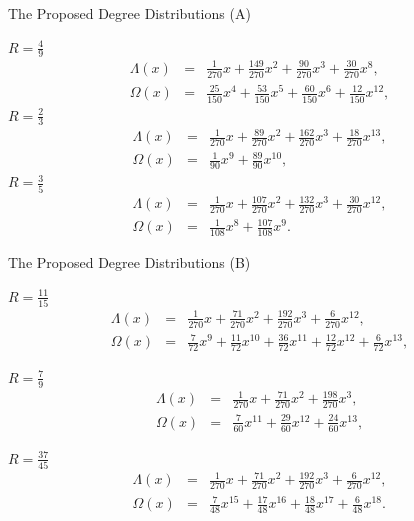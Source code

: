 \documentclass[11pt, aspectratio=169]{beamer}
\begin{document}
\begin{frame}{The Proposed Degree Distributions (A)}

{\footnotesize  $R=\frac{4}{9}$ 
\begin{eqnarray}
\Lambda (x)&=&\frac{1}{270}x+\frac{149}{270}x^2+\frac{90}{270}x^3+\frac{30}{270}x^8, \\
\Omega(x)&=&\frac{25}{150}x^4+\frac{53}{150}x^5+\frac{60}{150}x^6+\frac{12}{150}x^{12},
\end{eqnarray}
$R=\frac{2}{3}$ 
\begin{eqnarray}
\Lambda (x)&=&\frac{1}{270}x+\frac{89}{270}x^{2}+\frac{162}{270}x^{3}+\frac{18}{270}x^{13},\\
\Omega(x)&=&\frac{1}{90}x^{9}+\frac{89}{90}x^{10},
\end{eqnarray}
$R=\frac{3}{5}$
\begin{eqnarray}
\Lambda (x)&=&\frac{1}{270}x+\frac{107}{270}x^2+\frac{132}{270}x^3+\frac{30}{270}x^{12},\\
\Omega(x)&=&\frac{1}{108}x^8+\frac{107}{108}x^9.
\end{eqnarray}
}
\end{frame}
\begin{frame}{The Proposed Degree Distributions (B)}

{\footnotesize
$R=\frac{11}{15}$
\begin{eqnarray}
\Lambda (x)&=&\frac{1}{270}x+\frac{71}{270}x^{2}+\frac{192}{270}x^{3}+\frac{6}{270}x^{12},\\
\Omega(x)&=&\frac{7}{72}x^{9}+\frac{11}{72}x^{10}+\frac{36}{72}x^{11}+\frac{12}{72}x^{12}  +\frac{6}{72}x^{13},
\end{eqnarray}


$R=\frac{7}{9}$
\begin{eqnarray}
\Lambda (x)&=&\frac{1}{270}x+\frac{71}{270}x^2+\frac{198}{270}x^3,\\
\Omega(x)&=&\frac{7}{60}x^{11}+\frac{29}{60}x^{12}+\frac{24}{60}x^{13},
\end{eqnarray}

$R=\frac{37}{45}$
\begin{eqnarray}
\Lambda (x)&=&\frac{1}{270}x+\frac{71}{270}x^{2}+\frac{192}{270}x^{3}+\frac{6}{270}x^{12},\\
\Omega(x)&=&\frac{7}{48}x^{15}+\frac{17}{48}x^{16}+\frac{18}{48}x^{17}+\frac{6}{48}x^{18}.
\end{eqnarray}
}


\end{frame}
\end{document}

